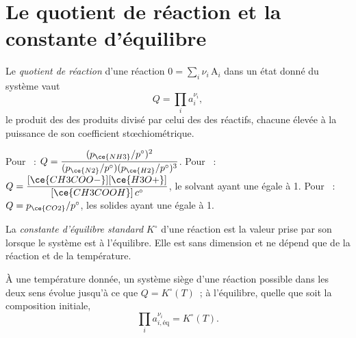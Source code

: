 \section{Le quotient de réaction et la constante d'équilibre}

\begin{definition}\label{def:b1:extent-q-and-k:quotient}
Le \emph{quotient de réaction} d'une réaction
$0 = \sum_i \nu_i\,\mathrm{A}_i$ dans un état donné du système vaut
\[
  Q = \prod_i a_i^{\nu_i} ,
\]
le produit des  des produits divisé par celui des  des
réactifs, chacune élevée à la puissance de son coefficient
stœchiométrique.
\end{definition}

\begin{example}\label{ex:b1:extent-q-and-k:quotients}
Pour ~: $Q = \dfrac{(p_{\ce{NH3}}/p^\circ)^2}
{(p_{\ce{N2}}/p^\circ)(p_{\ce{H2}}/p^\circ)^3}$. Pour
~: $Q =
\dfrac{[\ce{CH3COO-}][\ce{H3O+}]}{[\ce{CH3COOH}]\,c^\circ}$, le solvant
ayant une  égale à 1. Pour ~:
$Q =
p_{\ce{CO2}}/p^\circ$, les solides ayant une  égale à 1.
\end{example}

\begin{definition}\label{def:b1:extent-q-and-k:equilibrium-constant}
La \emph{constante d'équilibre standard}
$K^\circ$ d'une réaction est la valeur prise par son  lorsque le système est à l'équilibre. Elle est sans dimension et
ne dépend que de la réaction et de la température.
\end{definition}

\begin{theorem}\label{thm:b1:extent-q-and-k:mass-action}
À une température donnée, un système siège d'une réaction possible dans
les deux sens évolue jusqu'à ce que $Q = K^\circ(T)$~; à l'équilibre,
quelle que soit la composition initiale,
\[
  \prod_i a_{i,\text{éq}}^{\nu_i} = K^\circ(T) .
\]
\end{theorem}
\admitted

